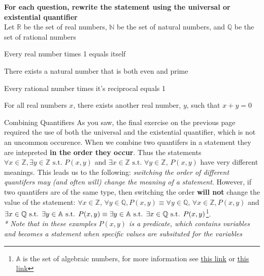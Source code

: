 \textbf{For each question, rewrite the statement using the universal or existential quantifier} \\ 
Let $\mathbb{R}$ be the set of real numbers, $\mathbb{N}$ be the set of natural numbers, and $\mathbb{Q}$ be the set of rational numbers

\begin{questions}
  \begin{minipage}{0.45\linewidth}
    \question Every real number times 1 equals itself
  \end{minipage}
  \hfill 
  \begin{minipage}{0.45\linewidth}
    \question There exists a natural number that is both even and prime
  \end{minipage} 

  \begin{minipage}{0.45\linewidth}
    \question Every rational number times it's reciprocal equals 1
  \end{minipage}
  \hfill 
  \begin{minipage}{0.45\linewidth}
    \question For all real numbers $x$, there exists another real number, $y$, such that $x+y=0$
  \end{minipage}
\end{questions}

\newpage 

\begin{definition}{Combining Quantifiers}{}
  As you saw, the final exercise on the previous page required the use of both the universal and the existential quantifier, which is not an uncommon occurence. When we combine two quantifers in a statement they are intepreted \textbf{in the order they occur}. Thus the statements $\forall x \in \mathbb{Z}, \exists y \in \mathbb{Z} \text{ s.t. } P(x, y) $ and $\exists x \in \mathbb{Z} \text{ s.t. } \forall y \in \mathbb{Z}\text{, } P(x, y) $ have very different meanings. This leads us to the following: \textit{switching the order of different quantifers may (and often will) change the meaning of a statement}. However, if two quantifers are of the same type, then switching the order \textbf{will not} change the value of the statement: $\forall x \in \mathbb{Z}\text{, } \forall y \in \mathbb{Q}, P(x, y) \equiv \forall y \in \mathbb{Q}\text{, } \forall x \in \mathbb{Z}, P(x, y)$ and $\exists x \in \mathbb{Q} \text{ s.t. } \exists y \in \mathbb{A} \text{ s.t. } P(x, y) \equiv \exists y \in \mathbb{A} \text{ s.t. } \exists x \in \mathbb{Q} \text{ s.t. } P(x, y)$\footnote{$\mathbb{A}$ is the set of algebraic numbers, for more information see \href{https://en.wikipedia.org/wiki/Algebraic_number}{\underline{this link}} or \href{https://www.mathsisfun.com/numbers/algebraic-numbers.html}{\underline{this link}}}. \\ 
  \small \textit{* Note that in these examples $P(x, y)$ is a predicate, which contains variables and becomes a statement when specific values are subsituted for the variables}
\end{definition}

